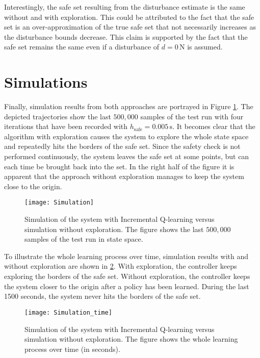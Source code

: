 \documentclass[../main.tex]{subfiles}
\begin{document}
Interestingly, the safe set resulting from the disturbance estimate is the same without and with exploration. This could be attributed to the fact that the safe set is an over-approximation of the true safe set that not necessarily increases as the disturbance bounds decrease. This claim is supported by the fact that the safe set remains the same even if a disturbance of $d = 0\,\text{N}$ is assumed.\par
\section{Simulations}
Finally, simulation results from both approaches are portrayed in Figure \ref{fig:Simulation}. The depicted trajectories show the last $500,000$ samples of the test run with four iterations that have been recorded with $h_\text{safe} = 0.005\,\text{s}$. It becomes clear that the algorithm with exploration causes the system to explore the whole state space and repeatedly hits the borders of the safe set. Since the safety check is not performed continuously, the system leaves the safe set at some points, but can each time be brought back into the set. In the right half of the figure it is apparent that the approach without exploration manages to keep the system close to the origin. 

\begin{figure}
    \centering
    \texttt{[image: Simulation]}
        \caption{Simulation of the system with Incremental Q-learning versus simulation without exploration. The figure shows the last $500,000$ samples of the test run in state space.}\label{fig:Simulation}
\end{figure}

To illustrate the whole learning process over time, simulation results with and without exploration are shown in \ref{fig:Simulation_time}. With exploration, the controller keeps exploring the borders of the safe set. Without exploration, the controller keeps the system closer to the origin after a policy has been learned. During the last 1500 seconds, the system never hits the borders of the safe set.

\begin{figure}
    \centering
    \texttt{[image: Simulation\_time]}
        \caption{Simulation of the system with Incremental Q-learning versus simulation without exploration. The figure shows the whole learning process over time (in seconds).}\label{fig:Simulation_time}
\end{figure}
\end{document}
